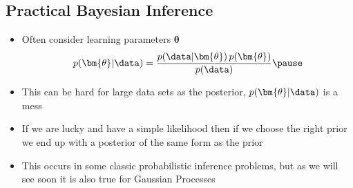 \begin{slide}
\section{Practical Bayesian Inference}
 
\begin{PauseHighLight}
  \begin{itemize}
  \item Often consider learning parameters $\bm{\theta}$
    \begin{align*}
      p(\bm{\theta}|\data) =
      \frac{p(\data|\bm{\theta})\,p(\bm{\theta})}{p(\data)}\pause
    \end{align*}
  \item This can be hard for large data sets as the posterior,
    $p(\bm{\theta}|\data)$ is a mess\pause
  \item If we are lucky and have a simple likelihood then if we choose
    the right prior we end up with a posterior of the same form as the
    prior\pause
  \item This occurs in some classic probabilistic inference problems,
    but as we will see soon it is also true for Gaussian Processes\pause
  \end{itemize}
\end{PauseHighLight}

\end{slide}



\Outline %


